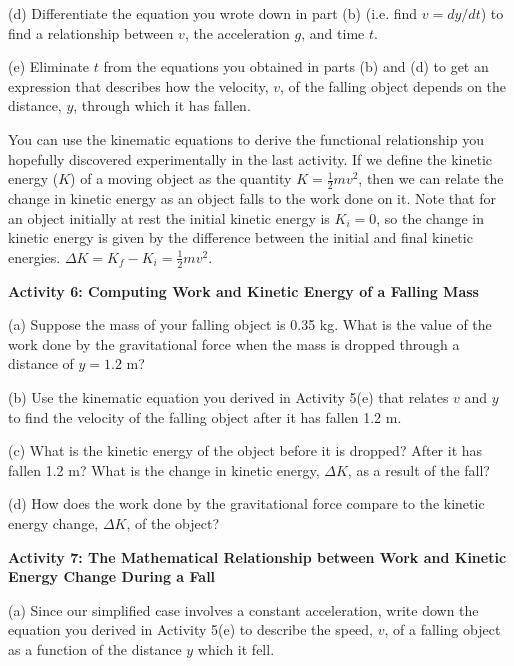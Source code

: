 (d) Differentiate the equation you wrote down in part (b) (i.e. find $v = dy/dt$) to find a relationship between $v$, the acceleration $g$, and time $t$.
\answerspace{20mm}

(e) Eliminate $t$ from the equations you obtained in parts (b) and (d) to get
an expression that describes how the velocity, $v$, 
of the falling object depends
on the distance, $y$, through which it has fallen. 
\answerspace{20mm}

You can use the kinematic equations to derive the functional relationship you
hopefully discovered experimentally in the last activity. If we define the kinetic
energy ($K$) of a moving object as the quantity $K = \frac{1}{2}mv^{2}$, then we
can relate the change in kinetic energy as an object falls to the work done
on it. Note that for an object initially at rest the initial kinetic energy
is \(K _{i}=0\), so the change in kinetic energy is given by the difference
between the initial and final kinetic energies. \( \Delta  K = K _{f}
- K_{i}  = \frac{1}{2}mv^{2} \).

\bigskip
\textbf{Activity 6: Computing Work and Kinetic Energy of a Falling Mass} 

(a) Suppose the mass of your falling object is 0.35 kg. What is the value of
the work done by the gravitational force when the mass is dropped through a
distance of $y = 1.2$ m? 
\answerspace{20mm}

(b) Use the kinematic equation you derived in Activity 5(e) that relates $v$ and
$y$ to find the velocity of the falling object after it has fallen 1.2 m.
\answerspace{20mm}

(c) What is the kinetic energy of the object before it is dropped? After it
has fallen 1.2 m? What is the change in kinetic energy, \( \Delta  K\), as
a result of the fall?
\answerspace{20mm}

(d) How does the work done by the gravitational force compare to the kinetic
energy change, \( \Delta  K\), of the object?
\answerspace{20mm}

\pagebreak[2]

\textbf{Activity 7: The Mathematical Relationship between Work and Kinetic Energy
Change During a Fall }

(a) Since our simplified case involves a constant acceleration, write down the
equation you derived in Activity 5(e) to describe the speed, $v$, of a falling
object as a function of the distance $y$ which it fell.
\vspace{10mm}

